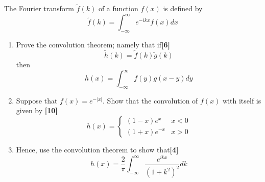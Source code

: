 \documentclass[a4paper]{article}
\begin{document}
\begin{qns}
The Fourier transform $\tilde{f}(k)$ of a function $f(x)$ is defined by
$$\tilde{f}(k)=\int_{-\infty}^\infty e^{-ikx}f(x)dx$$
\begin{enumerate}[label=(\roman*)]
\item Prove the convolution theorem; namely that if\hfill\textbf{[6]}
$$\tilde{h}(k)=\tilde{f}(k)\tilde{g}(k)$$
then
$$h(x)=\int_{-\infty}^\infty f(y)g(x-y)dy$$
\item Suppose that $f(x) = e^{−|x|}$. Show that the convolution of $f(x)$ with itself is given by \hfill\textbf{[10]}
$$h(x)=
\left\{
        \begin{array}{ll}
      (1-x)e^x & x<0 \\
      (1+x)e^{-x} & x>0
        \end{array}
    \right.$$
\item Hence, use the convolution theorem to show that\hfill\textbf{[4]}
$$h(x)=\frac{2}{\pi}\int_{-\infty}^\infty\frac{e^{ikx}}{(1+k^2)^2}dk$$
\end{enumerate}
\end{qns}
\end{document}

